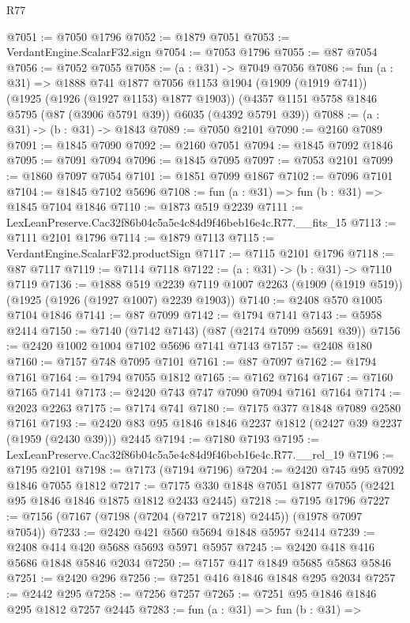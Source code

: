 \begin{lexlean}{R77}
\begin{coremodule}
@7051 := @7050 @1796
@7052 := @1879 @7051
@7053 := VerdantEngine.ScalarF32.sign
@7054 := @7053 @1796
@7055 := @87 @7054
@7056 := @7052 @7055
@7058 := (a : @31) -> @7049 @7056
@7086 := fun (a : @31) =>
  @1888
    @741
    @1877
    @7056
    @1153
    @1904
    (@1909 (@1919 @741))
    (@1925 (@1926 (@1927 @1153) @1877 @1903))
    (@4357 @1151 @5758 @1846 @5795 (@87 (@3906 @5791 @39)) @6035 (@4392 @5791 @39))
@7088 := (a : @31) -> (b : @31) -> @1843
@7089 := @7050 @2101
@7090 := @2160 @7089
@7091 := @1845 @7090
@7092 := @2160 @7051
@7094 := @1845 @7092 @1846
@7095 := @7091 @7094
@7096 := @1845 @7095
@7097 := @7053 @2101
@7099 := @1860 @7097 @7054
@7101 := @1851 @7099 @1867
@7102 := @7096 @7101
@7104 := @1845 @7102 @5696
@7108 := fun (a : @31) => fun (b : @31) => @1845 @7104 @1846
@7110 := @1873 @519 @2239
@7111 := LexLeanPreserve.Cac32f86b04c5a5e4c84d9f46beb16e4c.R77.__fits_15
@7113 := @7111 @2101 @1796
@7114 := @1879 @7113
@7115 := VerdantEngine.ScalarF32.productSign
@7117 := @7115 @2101 @1796
@7118 := @87 @7117
@7119 := @7114 @7118
@7122 := (a : @31) -> (b : @31) -> @7110 @7119
@7136 := @1888
    @519
    @2239
    @7119
    @1007
    @2263
    (@1909 (@1919 @519))
    (@1925 (@1926 (@1927 @1007) @2239 @1903))
@7140 := @2408 @570 @1005 @7104 @1846
@7141 := @87 @7099
@7142 := @1794 @7141
@7143 := @5958 @2414
@7150 := @7140 (@7142 @7143) (@87 (@2174 @7099 @5691 @39))
@7156 := @2420 @1002 @1004 @7102 @5696 @7141 @7143
@7157 := @2408 @180
@7160 := @7157 @748 @7095 @7101
@7161 := @87 @7097
@7162 := @1794 @7161
@7164 := @1794 @7055 @1812
@7165 := @7162 @7164
@7167 := @7160 @7165 @7141
@7173 := @2420 @743 @747 @7090 @7094 @7161 @7164
@7174 := @2023 @2263
@7175 := @7174 @741
@7180 := @7175 @377 @1848 @7089 @2580 @7161
@7193 := @2420 @83 @95 @1846 @1846 @2237 @1812 (@2427 @39 @2237 (@1959 (@2430 @39))) @2445
@7194 := @7180 @7193
@7195 := LexLeanPreserve.Cac32f86b04c5a5e4c84d9f46beb16e4c.R77.__rel_19
@7196 := @7195 @2101
@7198 := @7173 (@7194 @7196)
@7204 := @2420 @745 @95 @7092 @1846 @7055 @1812
@7217 := @7175 @330 @1848 @7051 @1877 @7055 (@2421 @95 @1846 @1846 @1875 @1812 @2433 @2445)
@7218 := @7195 @1796
@7227 := @7156 (@7167 (@7198 (@7204 (@7217 @7218) @2445)) (@1978 @7097 @7054))
@7233 := @2420 @421 @560 @5694 @1848 @5957 @2414
@7239 := @2408 @414 @420 @5688 @5693 @5971 @5957
@7245 := @2420 @418 @416 @5686 @1848 @5846 @2034
@7250 := @7157 @417 @1849 @5685 @5863 @5846
@7251 := @2420 @296
@7256 := @7251 @416 @1846 @1848 @295 @2034
@7257 := @2442 @295
@7258 := @7256 @7257
@7265 := @7251 @95 @1846 @1846 @295 @1812 @7257 @2445
@7283 := fun (a : @31) =>
  fun (b : @31) =>

\end{coremodule}
\end{lexlean}
